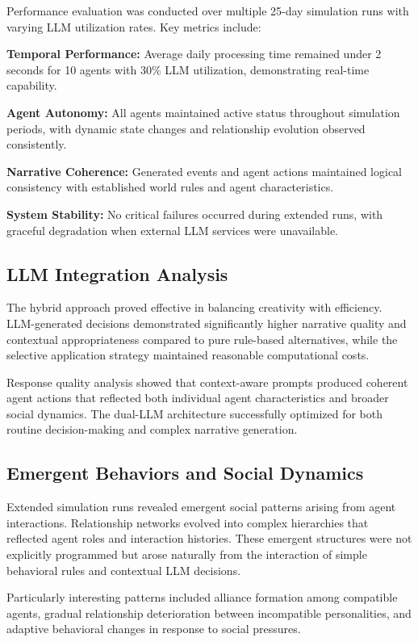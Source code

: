 \documentclass[conference]{IEEEtran}
\begin{document}
Performance evaluation was conducted over multiple 25-day simulation runs with varying LLM utilization rates. Key metrics include:

\textbf{Temporal Performance:} Average daily processing time remained under 2 seconds for 10 agents with 30\% LLM utilization, demonstrating real-time capability.

\textbf{Agent Autonomy:} All agents maintained active status throughout simulation periods, with dynamic state changes and relationship evolution observed consistently.

\textbf{Narrative Coherence:} Generated events and agent actions maintained logical consistency with established world rules and agent characteristics.

\textbf{System Stability:} No critical failures occurred during extended runs, with graceful degradation when external LLM services were unavailable.

\subsection{LLM Integration Analysis}

The hybrid approach proved effective in balancing creativity with efficiency. LLM-generated decisions demonstrated significantly higher narrative quality and contextual appropriateness compared to pure rule-based alternatives, while the selective application strategy maintained reasonable computational costs.

Response quality analysis showed that context-aware prompts produced coherent agent actions that reflected both individual agent characteristics and broader social dynamics. The dual-LLM architecture successfully optimized for both routine decision-making and complex narrative generation.

\subsection{Emergent Behaviors and Social Dynamics}

Extended simulation runs revealed emergent social patterns arising from agent interactions. Relationship networks evolved into complex hierarchies that reflected agent roles and interaction histories. These emergent structures were not explicitly programmed but arose naturally from the interaction of simple behavioral rules and contextual LLM decisions.

Particularly interesting patterns included alliance formation among compatible agents, gradual relationship deterioration between incompatible personalities, and adaptive behavioral changes in response to social pressures.
\end{document}
